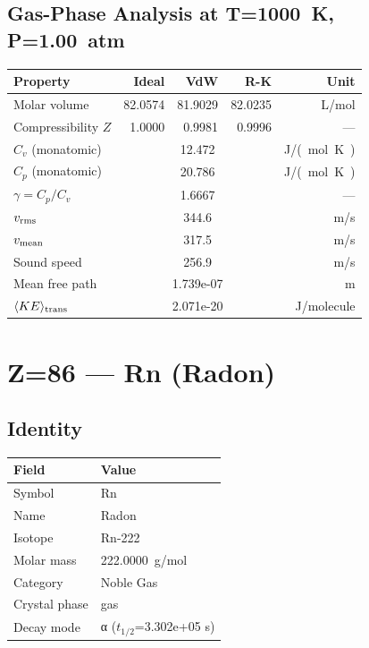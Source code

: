 \documentclass[11pt,a4paper]{article}
\begin{document}
\subsection{Gas-Phase Analysis at T=\SI{1000}{K}, P=\SI{1.00}{atm}}
\begin{tabular}{lrrrr}
  \toprule
  Property & Ideal & VdW & R-K & Unit \\
  \midrule
  Molar volume & 82.0574 & 81.9029 & 82.0235 & \si{L/mol} \\
  Compressibility $Z$ & 1.0000 & 0.9981 & 0.9996 & --- \\
  \midrule
  $C_v$ (monatomic) & \multicolumn{3}{c}{12.472} & \si{J/(mol.K)} \\
  $C_p$ (monatomic) & \multicolumn{3}{c}{20.786} & \si{J/(mol.K)} \\
  $\gamma = C_p/C_v$ & \multicolumn{3}{c}{1.6667} & --- \\
  $v_{\rm rms}$ & \multicolumn{3}{c}{344.6} & \si{m/s} \\
  $v_{\rm mean}$ & \multicolumn{3}{c}{317.5} & \si{m/s} \\
  Sound speed & \multicolumn{3}{c}{256.9} & \si{m/s} \\
  Mean free path & \multicolumn{3}{c}{1.739e-07} & \si{m} \\
  $\langle KE \rangle_{\rm trans}$ & \multicolumn{3}{c}{2.071e-20} & \si{J/molecule} \\
  \bottomrule
\end{tabular}

\newpage

\section{Z=86 --- Rn (Radon)}
\label{sec:Z86}

\subsection{Identity}
\begin{tabular}{ll}
  \toprule
  Field & Value \\
  \midrule
  Symbol & Rn \\
  Name & Radon \\
  Isotope & Rn-222 \\
  Molar mass & \SI{222.0000}{g/mol} \\
  Category & Noble Gas \\
  Crystal phase & gas \\
  Decay mode & α ($t_{1/2}$=3.302e+05 s) \\
  \bottomrule
\end{tabular}
\end{document}
